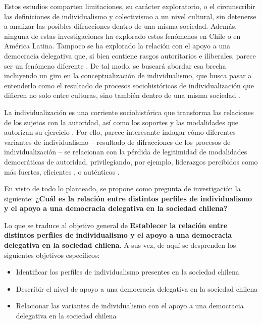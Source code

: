 \documentclass[12pt,twoside]{templates/facsothesis}
\providecommand{\tightlist}{%
  \setlength{\itemsep}{0pt}\setlength{\parskip}{0pt}}
\begin{document}
Estos estudios comparten limitaciones, su carácter exploratorio, o el circunscribir las definiciones de individualismo y colectivismo a un nivel cultural, sin detenerse a analizar las posibles difracciones dentro de una misma sociedad. Además, ninguna de estas investigaciones ha explorado estos fenómenos en Chile o en América Latina. Tampoco se ha explorado la relación con el apoyo a una democracia delegativa que, si bien contiene rasgos autoritarios e iliberales, parece ser un fenómeno diferente \citep{carlin2011, carlin2018}. De tal modo, se buscará abordar esa brecha incluyendo un giro en la conceptualización de individualismo, que busca pasar a entenderlo como el resultado de procesos sociohistóricos de individualización que difieren no solo entre culturas, sino también dentro de una misma sociedad \citep{martuccelli2018}.

La individualización es una corriente sociohistórica que transforma las relaciones de los sujetos con la autoridad, así como los soportes y las modalidades que autorizan su ejercicio \citep{araujo2021}. Por ello, parece interesante indagar cómo diferentes variantes de individualismo -- resultado de difracciones de los procesos de individualización -- se relacionan con la pérdida de legitimidad de modalidades democráticas de autoridad, privilegiando, por ejemplo, liderazgos percibidos como más fuertes, eficientes \citep{araujo2022, araujo2022a}, o auténticos \citep{gauthier2021}.

En visto de todo lo planteado, se propone como pregunta de investigación la siguiente: \textbf{¿Cuál es la relación entre distintos perfiles de individualismo y el apoyo a una democracia delegativa en la sociedad chilena?}

Lo que se traduce al objetivo general de \textbf{Establecer la relación entre distintos perfiles de individualismo y el apoyo a una democracia delegativa en la sociedad chilena}. A sus vez, de aquí se desprenden los siguientes objetivos específicos:

\begin{itemize}
\tightlist
\item
  Identificar los perfiles de individualismo presentes en la sociedad chilena
\item
  Describir el nivel de apoyo a una democracia delegativa en la sociedad chilena
\item
  Relacionar las variantes de individualismo con el apoyo a una democracia delegativa en la sociedad chilena
\end{itemize}
\end{document}
